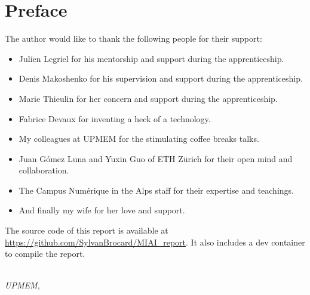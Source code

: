 \chapter*{Preface}

The author would like to thank the following people for their support:
\begin{itemize}
    \item Julien Legriel for his mentorship and support during the apprenticeship.
    \item Denis Makoshenko for his supervision and support during the apprenticeship.
    \item Marie Thieulin for her concern and support during the apprenticeship.
    \item Fabrice Devaux for inventing a heck of a technology.
    \item My colleagues at UPMEM for the stimulating coffee breaks talks.
    \item Juan Gómez Luna and Yuxin Guo of ETH Zürich for their open mind and collaboration.
    \item The Campus Numérique in the Alps staff for their expertise and teachings.
    \item And finally my wife for her love and support.
\end{itemize}

The source code of this report is available at \url{https://github.com/SylvanBrocard/MIAI_report}. It also includes a dev container to compile the report.

\begin{flushright}
{\makeatletter\itshape
    \@author \\
    UPMEM, \monthname{} \the\year{}
\makeatother}
\end{flushright}
